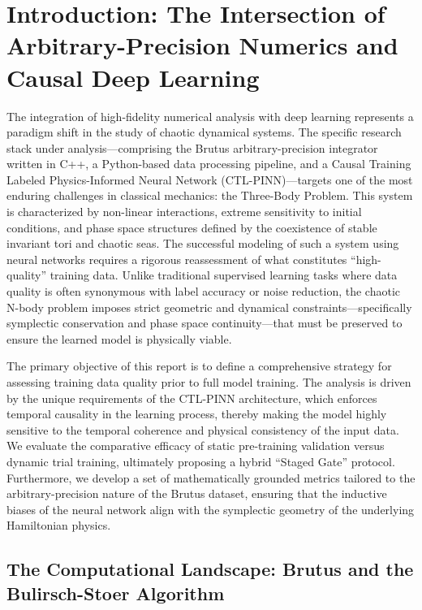 \section{Introduction: The Intersection of Arbitrary-Precision Numerics and Causal Deep Learning}

The integration of high-fidelity numerical analysis with deep learning represents a paradigm shift in the study of chaotic dynamical systems. The specific research stack under analysis—comprising the Brutus arbitrary-precision integrator written in C++, a Python-based data processing pipeline, and a Causal Training Labeled Physics-Informed Neural Network (CTL-PINN)—targets one of the most enduring challenges in classical mechanics: the Three-Body Problem. This system is characterized by non-linear interactions, extreme sensitivity to initial conditions, and phase space structures defined by the coexistence of stable invariant tori and chaotic seas. The successful modeling of such a system using neural networks requires a rigorous reassessment of what constitutes ``high-quality'' training data. Unlike traditional supervised learning tasks where data quality is often synonymous with label accuracy or noise reduction, the chaotic N-body problem imposes strict geometric and dynamical constraints—specifically symplectic conservation and phase space continuity—that must be preserved to ensure the learned model is physically viable.

The primary objective of this report is to define a comprehensive strategy for assessing training data quality prior to full model training. The analysis is driven by the unique requirements of the CTL-PINN architecture, which enforces temporal causality in the learning process, thereby making the model highly sensitive to the temporal coherence and physical consistency of the input data. We evaluate the comparative efficacy of static pre-training validation versus dynamic trial training, ultimately proposing a hybrid ``Staged Gate'' protocol. Furthermore, we develop a set of mathematically grounded metrics tailored to the arbitrary-precision nature of the Brutus dataset, ensuring that the inductive biases of the neural network align with the symplectic geometry of the underlying Hamiltonian physics.

\subsection{The Computational Landscape: Brutus and the Bulirsch-Stoer Algorithm}


